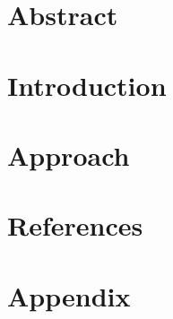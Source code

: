 



\nocite{*} %

\maketitle

\thispagestyle{empty}

\newpage

\setcounter{page}{1}

\section{Abstract}



\section{Introduction}



\section{Approach}



\newpage

\section{References}

\printbibliography[heading=none]

\section{Appendix}


